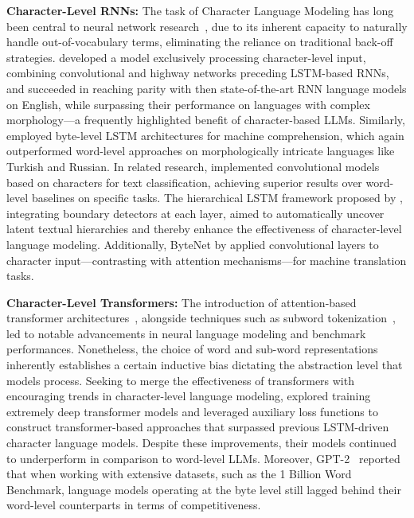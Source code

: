 \textbf{Character-Level RNNs:} The task of Character Language Modeling has long been central to neural network research~\citep{sutskever2011generating,mikolov2012subword,graves2013generating}, due to its inherent capacity to naturally handle out-of-vocabulary terms, eliminating the reliance on traditional back-off strategies. \cite{kim2016character} developed a model exclusively processing character-level input, combining convolutional and highway networks preceding LSTM-based RNNs, and succeeded in reaching parity with then state-of-the-art RNN language models on English, while surpassing their performance on languages with complex morphology—a frequently highlighted benefit of character-based LLMs. Similarly, \cite{kenter2018byte} employed byte-level LSTM architectures for machine comprehension, which again outperformed word-level approaches on morphologically intricate languages like Turkish and Russian. In related research, \cite{zhang2015character} implemented convolutional models based on characters for text classification, achieving superior results over word-level baselines on specific tasks. The hierarchical LSTM framework proposed by \citet{chung2019hierarchical}, integrating boundary detectors at each layer, aimed to automatically uncover latent textual hierarchies and thereby enhance the effectiveness of character-level language modeling. Additionally, ByteNet by \cite{kalchbrenner2016neural} applied convolutional layers to character input—contrasting with attention mechanisms—for machine translation tasks.

\textbf{Character-Level Transformers:} The introduction of attention-based transformer architectures~\citep{vaswani2017attention}, alongside techniques such as subword tokenization~\citep{sennrich-etal-2016-neural}, led to notable advancements in neural language modeling and benchmark performances. Nonetheless, the choice of word and sub-word representations inherently establishes a certain inductive bias dictating the abstraction level that models process. Seeking to merge the effectiveness of transformers with encouraging trends in character-level language modeling, \citet{al2019character} explored training extremely deep transformer models and leveraged auxiliary loss functions to construct transformer-based approaches that surpassed previous LSTM-driven character language models. Despite these improvements, their models continued to underperform in comparison to word-level LLMs. Moreover, GPT-2~\citep{radfordgpt2} reported that when working with extensive datasets, such as the 1 Billion Word Benchmark, language models operating at the byte level still lagged behind their word-level counterparts in terms of competitiveness.

